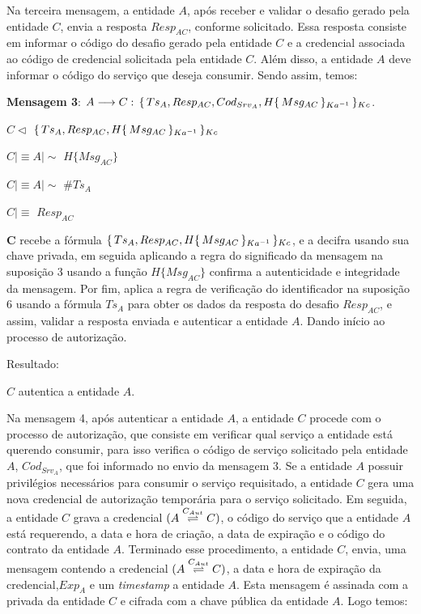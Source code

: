 Na terceira mensagem, a entidade ${A}$, após receber e validar o desafio gerado pela entidade ${C}$, envia a resposta ${Resp_{AC}}$, conforme solicitado. Essa resposta consiste em informar o código do desafio gerado pela entidade ${C}$ e a credencial associada ao código de credencial solicitada pela entidade ${C}$. Além disso, a entidade ${A}$ deve informar o código do serviço que deseja consumir. Sendo assim, temos:

\textbf{Mensagem 3}: ${A}\longrightarrow{C}:\,{\{\,{Ts_A,{Resp_{AC}},Cod_{Srv_A},H{\{\,{Msg_{AC}}\,\}_{Ka ^{-1}}}}\,\}_{Kc}}$.

$C\triangleleft$ ${\{\,{Ts_A,{Resp_{AC}},H{\{\,{Msg_{AC}}\,\}_{Ka ^{-1}}}}\,\}_{Kc}}$

$C\mid\equiv A \mid\sim $  $H \{Msg_{AC}\}$

$C\mid\equiv A \mid\sim$ ${\#Ts_A}$

$C\mid\equiv$ ${Resp_{AC}}$

${\textbf{C}}$ recebe a fórmula ${\{\,{Ts_A,{Resp_{AC}},H{\{\,{Msg_{AC}}\,\}_{Ka ^{-1}}}}\,\}_{Kc}}$, e a decifra usando sua chave privada, em seguida aplicando a regra do significado da mensagem na suposição 3 usando a função $H \{Msg_{AC}\}$ confirma a autenticidade e integridade da mensagem. Por fim, aplica a regra de verificação do identificador na suposição 6 usando a fórmula ${Ts_A}$ para obter os dados da resposta do desafio ${Resp_{AC}}$, e assim, validar a resposta enviada e autenticar a entidade ${A}$. Dando início ao processo de autorização.

Resultado:

${C}$ autentica a entidade ${A}$.

Na mensagem 4, após autenticar a entidade ${A}$, a entidade ${C}$ procede com o processo de autorização, que consiste em verificar qual serviço a entidade está querendo consumir, para isso verifica o código de serviço solicitado pela entidade ${A}$, $Cod_{Srv_A}$, que foi informado no envio da mensagem 3. Se a entidade ${A}$ possuir privilégios necessários para consumir o serviço requisitado, a entidade ${C}$ gera uma nova credencial de autorização temporária para o serviço solicitado. Em seguida, a entidade ${C}$ grava a credencial ${({A}\stackrel{{C_{Aut}}}{\rightleftharpoons}{C})}$, o código do serviço que a entidade ${A}$ está requerendo, a data e hora de criação, a data de expiração e o código do contrato da entidade ${A}$. Terminado esse procedimento, a entidade ${C}$, envia, uma mensagem contendo a credencial ${({A}\stackrel{{C_{Aut}}}{\rightleftharpoons}{C})}$, a data e hora de expiração da credencial,${Exp_A}$ e um \emph{timestamp} a entidade ${A}$. Esta mensagem é assinada com a privada da entidade ${C}$ e cifrada com a chave pública da entidade ${A}$. Logo temos:

